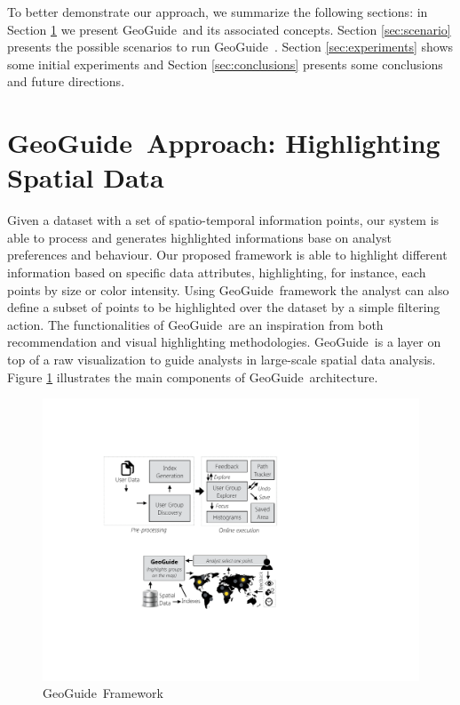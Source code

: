 \documentclass[conference,compsoc]{IEEEtran}
\newcommand{\framework}{{\sc GeoGuide}}
\begin{document}
To better demonstrate our approach, we summarize the following sections: in Section \ref{sec:pb}  we present \framework\, and its associated concepts. Section \ref{sec:scenario}  presents the possible scenarios to run \framework\ . Section  \ref{sec:experiments}  shows some initial experiments and Section \ref{sec:conclusions}  presents some conclusions and future directions. 


\section{\framework\ Approach: Highlighting Spatial Data}
\label{sec:pb}

Given a dataset with a set of spatio-temporal information points, our system is able to process and generates highlighted informations base on analyst preferences and behaviour. Our proposed framework is able to highlight different information based on specific data attributes, highlighting, for instance, each points by size or color intensity. Using \framework\ framework the analyst can also define a subset of points to be highlighted over the dataset by a simple filtering action. The functionalities of \framework\ are an inspiration from both recommendation \cite{Omidvar-Tehrani:2015} and visual highlighting \cite{Liang2010,Robinson2011} methodologies. \framework\ is a layer on top of a raw visualization to guide analysts in large-scale spatial data analysis. Figure \ref{fig:framework} illustrates the main components of \framework\ architecture.


\begin{figure}[t]
  \centering
  \includegraphics[width=\columnwidth]{figs/framework}
\caption{\framework\ Framework}
\label{fig:framework}
\vspace{-10pt}
\end{figure}
\end{document}
